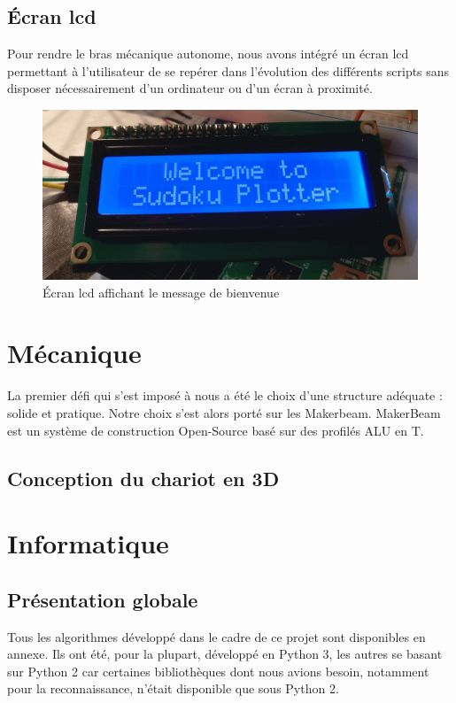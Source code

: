 \documentclass[12pt,a4paper]{report}
\begin{document}
\section{\'{E}cran lcd}
Pour rendre le bras mécanique autonome, nous avons intégré un écran lcd permettant à l'utilisateur de se repérer dans l'évolution des différents scripts sans disposer nécessairement d'un ordinateur ou d'un écran à proximité.
\begin{figure}[!h]
 \center
 \includegraphics[scale=0.3]{../pictures/ecran_lcd}
 \caption{\'{E}cran lcd affichant le message de bienvenue}
\end{figure}

	\chapter{Mécanique}
	
	La premier défi qui s'est imposé à nous a été le choix d'une structure adéquate : solide et pratique. Notre choix s'est alors porté sur les Makerbeam. MakerBeam est un système de construction Open-Source basé sur des profilés ALU en T.
	
	\section{Conception du chariot en 3D}
			
	
	\chapter{Informatique}
\section{Présentation globale}
	Tous les algorithmes développé dans le cadre de ce projet sont disponibles en annexe. Ils ont été, pour la plupart, développé en Python 3, les autres se basant sur Python 2 car certaines bibliothèques dont nous avions besoin, notamment pour la reconnaissance, n'était disponible que sous Python 2. 
	
\end{document}
